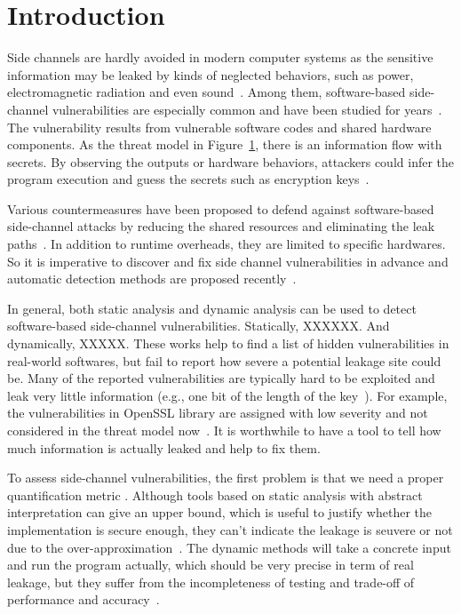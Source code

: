 \section{Introduction}
Side channels are hardly avoided in modern computer systems as the sensitive information 
may be leaked by kinds of neglected behaviors, 
such as power, electromagnetic radiation and even sound~\cite{}. 
Among them, software-based side-channel vulnerabilities are especially common and have been studied for years~\cite{}. 
The vulnerability results from vulnerable software codes and shared hardware components.
As the threat model in Figure~\ref{}, there is an information flow with secrets.  
By observing the outputs or hardware behaviors, attackers could 
infer the program execution and guess the secrets such as encryption keys~\cite{}.

Various countermeasures have been proposed to defend against 
software-based side-channel attacks by reducing the shared resources
and eliminating the leak paths~\cite{182946,203878,217537}. 
In addition to runtime overheads, they are limited to specific hardwares. 
So it is imperative to discover and fix side channel vulnerabilities in advance 
and automatic detection methods are proposed recently~\cite{}.

In general, both static analysis and dynamic analysis
can be used to detect software-based side-channel vulnerabilities.
Statically, XXXXXX. And dynamically, XXXXX.
These works help to find a list of hidden vulnerabilities in real-world softwares, 
but fail to report how severe a potential leakage site could be. 
Many of the reported vulnerabilities are typically hard to be exploited 
and leak very little information (e.g., one bit of the length of the key~\cite{203878}).  
For example, the vulnerabilities in OpenSSL library are assigned with low severity and not considered 
in the threat model now~\cite{https://www.openssl.org/policies/secpolicy.html}. 
It is worthwhile to have a tool to tell how much information is actually leaked and help to fix them.

To assess side-channel vulnerabilities, the first problem is that we need a proper quantification metric .
Although tools based on static analysis with abstract interpretation can give an upper bound, 
which is useful to justify whether the implementation is secure enough, 
they can’t indicate the leakage is seuvere or not due to the over-approximation~\cite{}. 
The dynamic methods will take a concrete input and run the program actually, which should be very precise in term of real leakage,
but they suffer from the incompleteness of testing and trade-off of performance and accuracy~\cite{}. 


